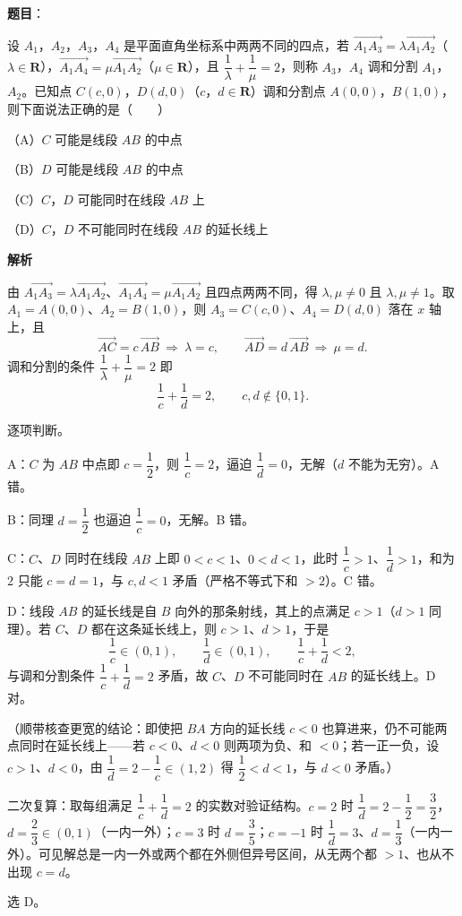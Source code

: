 \begin{answer}

\textbf{题目}：

设 $A_1$，$A_2$，$A_3$，$A_4$ 是平面直角坐标系中两两不同的四点，若 $\overrightarrow{A_1A_3}=\lambda\overrightarrow{A_1A_2}$（$\lambda\in\mathbf R$），$\overrightarrow{A_1A_4}=\mu\overrightarrow{A_1A_2}$（$\mu\in\mathbf R$），且 $\dfrac1\lambda+\dfrac1\mu=2$，则称 $A_3$，$A_4$ 调和分割 $A_1$，$A_2$。已知点 $C(c,0)$，$D(d,0)$（$c$，$d\in\mathbf R$）调和分割点 $A(0,0)$，$B(1,0)$，则下面说法正确的是\mbox{（　　）}

（A）$C$ 可能是线段 $AB$ 的中点

（B）$D$ 可能是线段 $AB$ 的中点

（C）$C$，$D$ 可能同时在线段 $AB$ 上

（D）$C$，$D$ 不可能同时在线段 $AB$ 的延长线上

\textbf{解析}

由 $\overrightarrow{A_1A_3}=\lambda\overrightarrow{A_1A_2}$、$\overrightarrow{A_1A_4}=\mu\overrightarrow{A_1A_2}$ 且四点两两不同，得 $\lambda,\mu\neq0$ 且 $\lambda,\mu\neq1$。取 $A_1=A(0,0)$、$A_2=B(1,0)$，则 $A_3=C(c,0)$、$A_4=D(d,0)$ 落在 $x$ 轴上，且
\nopagebreak[4]
\[
\overrightarrow{AC}=c\,\overrightarrow{AB}\ \Longrightarrow\ \lambda=c,\qquad
\overrightarrow{AD}=d\,\overrightarrow{AB}\ \Longrightarrow\ \mu=d.
\]
调和分割的条件 $\dfrac1\lambda+\dfrac1\mu=2$ 即
\nopagebreak[4]
\[
\frac1c+\frac1d=2,\qquad c,d\notin\{0,1\}.
\]

逐项判断。

A：$C$ 为 $AB$ 中点即 $c=\dfrac12$，则 $\dfrac1c=2$，逼迫 $\dfrac1d=0$，无解（$d$ 不能为无穷）。A 错。

B：同理 $d=\dfrac12$ 也逼迫 $\dfrac1c=0$，无解。B 错。

C：$C$、$D$ 同时在线段 $AB$ 上即 $0<c<1$、$0<d<1$，此时 $\dfrac1c>1$、$\dfrac1d>1$，和为 $2$ 只能 $c=d=1$，与 $c,d<1$ 矛盾（严格不等式下和 $>2$）。C 错。

D：线段 $AB$ 的延长线是自 $B$ 向外的那条射线，其上的点满足 $c>1$（$d>1$ 同理）。若 $C$、$D$ 都在这条延长线上，则 $c>1$、$d>1$，于是
\nopagebreak[4]
\[
\frac1c\in(0,1),\qquad \frac1d\in(0,1),\qquad \frac1c+\frac1d<2,
\]
与调和分割条件 $\dfrac1c+\dfrac1d=2$ 矛盾，故 $C$、$D$ 不可能同时在 $AB$ 的延长线上。D 对。

（顺带核查更宽的结论：即使把 $BA$ 方向的延长线 $c<0$ 也算进来，仍不可能两点同时在延长线上——若 $c<0$、$d<0$ 则两项为负、和 $<0$；若一正一负，设 $c>1$、$d<0$，由 $\dfrac1d=2-\dfrac1c\in(1,2)$ 得 $\dfrac12<d<1$，与 $d<0$ 矛盾。）

二次复算：取每组满足 $\dfrac1c+\dfrac1d=2$ 的实数对验证结构。$c=2$ 时 $\dfrac1d=2-\dfrac12=\dfrac32$，$d=\dfrac23\in(0,1)$（一内一外）；$c=3$ 时 $d=\dfrac35$；$c=-1$ 时 $\dfrac1d=3$、$d=\dfrac13$（一内一外）。可见解总是一内一外或两个都在外侧但异号区间，从无两个都 $>1$、也从不出现 $c=d$。

选 D。


\end{answer}
